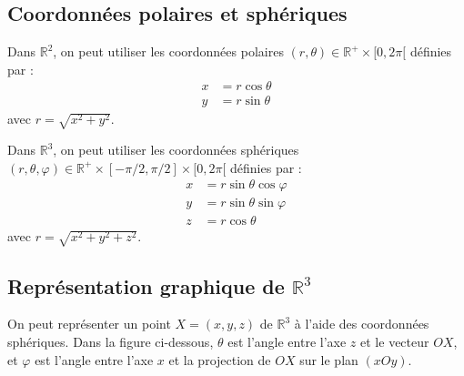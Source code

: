 \documentclass[oneside]{book}
\begin{document}
\subsection{Coordonnées polaires et sphériques}

Dans $\mathbb{R}^2$, on peut utiliser les coordonnées polaires $(r, \theta) \in \mathbb{R}^+ \times [0, 2\pi[$ définies par :
\begin{align*}
    x &= r \cos \theta \\
    y &= r \sin \theta
\end{align*}
avec $r = \sqrt{x^2 + y^2}$.

Dans $\mathbb{R}^3$, on peut utiliser les coordonnées sphériques $(r, \theta, \varphi) \in \mathbb{R}^+ \times [-\pi/2, \pi/2] \times [0, 2\pi[$ définies par :
\begin{align*}
    x &= r \sin \theta \cos \varphi \\
    y &= r \sin \theta \sin \varphi \\
    z &= r \cos \theta
\end{align*}
avec $r = \sqrt{x^2 + y^2 + z^2}$.

\subsection{Représentation graphique de $\mathbb{R}^3$}

On peut représenter un point $X = (x, y, z)$ de $\mathbb{R}^3$ à l'aide des coordonnées sphériques.
Dans la figure ci-dessous, $\theta$ est l'angle entre l'axe $z$ et le vecteur $OX$, et $\varphi$ est l'angle entre l'axe $x$ et la projection de $OX$ sur le plan $(xOy)$.
\end{document}
